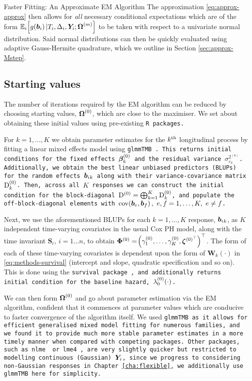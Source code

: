 \begin{chapter}{\label{cha:approx}Faster Fitting: An Approximate EM Algorithm}
  The approximation \eqref{eq:approx-approx} then allows for \textit{all} necessary conditional expectations which are of the form $\mathbb{E}_i\!\left[ g\!\left(\bm{b}_i\right)|T_i, \Delta_i, \bm{Y}_i; \bm{\mathrm{\Omega}}^{(m)}\right]$ to be taken with respect to a univariate normal distribution. Said normal distributions can then be quickly evaluated using adaptive Gauss-Hermite quadrature, which we outline in Section \ref{sec:approx-Mstep}. 

  \subsection{Starting values}\label{sec:approx-startvalues}
  The number of iterations required by the EM algorithm can be reduced by choosing starting values, $\bm{\mathrm{\Omega}}^{(0)}$, which are close to the maximiser. We set about obtaining these initial values using pre-existing \tt{R} packages.
  
  For $k=1,\dots,K$ we obtain parameter estimates for the $k^{\text{th}}$ longitudinal process by fitting a linear mixed effects model using \tt{glmmTMB} \citep{R-glmmTMB}. This returns initial conditions for the fixed effects $\bm{\beta}_k^{(0)}$ and the residual variance $\sigma_{\varepsilon_k}^{2^{(0)}}$. Additionally, we obtain the best linear unbiased predictors (BLUPs) for the random effects $\bm{b}_i{_k}$ along with their variance-covariance matrix $\mathrm{D}_k^{(0)}$. Then, across all $K$ responses we can construct the initial condition for the block-diagonal $\mathrm{D}^{(0)}=\bigoplus_{k=1}^K\mathrm{D}_k^{(0)}$, and populate the off-block-diagonal elements with $\mathrm{cov}\lb\bm{b}_e,\bm{b}_f\rb,\ e,f=1,\dots,K,\ e\neq f$.

  Next, we use the aforementioned BLUPs for each $k=1,\dots,K$ response, $\bm{b}_i{_k}$, as $K$ independent time-varying covariates in the usual Cox PH model, along with the time invariant $\bm{S}_i,\ i=1\dots n$, to obtain $\bm{\Phi}^{(0)}=\!\left(\gamma_1^{(0)},\dots,\gamma_K^{(0)},\bm{\zeta}^{(0)^{\top}}\right)^\top$. The form of each of these time-varying covariates is dependent upon the form of $\bm{W}_k(\cdot)$ in \eqref{eq:methods-survival} (\ie intercept and slope, quadratic specification and so on). This is done using the \tt{survival} package \citep{R-survival}, and additionally returns initial condition for the baseline hazard, $\lambda_0^{(0)}\!\left(\cdot\right)$.

  We can then form $\bm{\mathrm{\Omega}}^{(0)}$ and go about parameter estimation via the EM algorithm, confident that it commences at parameter values which are conducive to faster convergence of the algorithm itself. We used \tt{glmmTMB} as it allows for efficient generalised mixed model fitting for numerous families, and we found it to provide much more stable parameter estimates in a more timely manner when compared with competing packages. Other packages, such as \tt{nlme} \citep{R-nlme} or \tt{lme4} \citep{R-lme4}, are very slightly quicker but restricted to modelling continuous (Gaussian) $\bm{Y}_i$, since we progress to considering non-Gaussian responses in Chapter \ref{cha:flexible}, we additionally use \tt{glmmTMB} here for simplicity. 
  

\end{chapter}
